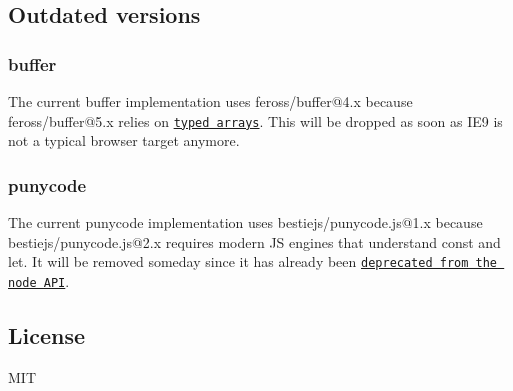 \subsection*{Outdated versions}

\subsubsection*{{\ttfamily buffer}}

The current {\ttfamily buffer} implementation uses feross/buffer@4.\+x because feross/buffer@5.\+x relies on \href{https://github.com/feross/buffer/commit/5daca86b7cd5d2b8ccb167534d47421029f639e9#commitcomment-19698936}{\tt typed arrays}. This will be dropped as soon as I\+E9 is not a typical browser target anymore.

\subsubsection*{{\ttfamily punycode}}

The current {\ttfamily punycode} implementation uses bestiejs/punycode.\+js@1.\+x because bestiejs/punycode.\+js@2.\+x requires modern JS engines that understand {\ttfamily const} and {\ttfamily let}. It will be removed someday since it has already been \href{https://nodejs.org/api/punycode.html}{\tt deprecated from the node A\+PI}.

\subsection*{License}

M\+IT 